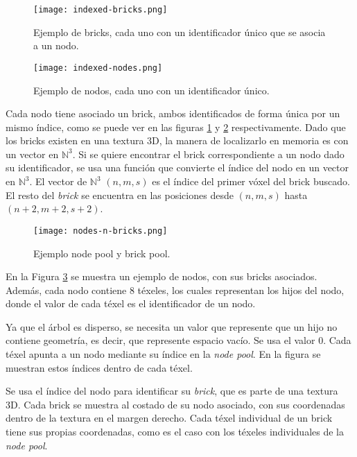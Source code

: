 \begin{figure}[h!]
    \centering
    \texttt{[image: indexed-bricks.png]}
    \caption{Ejemplo de bricks, cada uno con un identificador único que se asocia a un nodo.}
    \label{fig:indexed_bricks}
\end{figure}

\begin{figure}[h!]
    \centering
    \texttt{[image: indexed-nodes.png]}
    \caption{Ejemplo de nodos, cada uno con un identificador único.}
    \label{fig:indexed_nodes}
\end{figure}

Cada nodo tiene asociado un brick, ambos identificados de forma única por un mismo índice, como se puede ver en las figuras \ref{fig:indexed_bricks} y \ref{fig:indexed_nodes} respectivamente.
Dado que los bricks existen en una textura 3D, la manera de localizarlo en memoria es con un vector en $\mathbb{N}^3$.
Si se quiere encontrar el brick correspondiente a un nodo dado su identificador, se usa una función que convierte el índice del nodo en un vector en $\mathbb{N}^3$.
El vector de $\mathbb{N}^3$ $(n, m, s)$ es el índice del primer vóxel del brick buscado.
El resto del \textit{brick} se encuentra en las posiciones desde $(n, m, s)$ hasta $(n + 2, m + 2, s + 2)$.

\begin{figure}[h!]
    \centering
    \texttt{[image: nodes-n-bricks.png]}
    \caption{Ejemplo node pool y brick pool.}
    \label{fig:nodes_n_bricks}
\end{figure}

En la Figura \ref{fig:nodes_n_bricks} se muestra un ejemplo de nodos, con sus bricks asociados.
Además, cada nodo contiene $8$ téxeles, los cuales representan los hijos del nodo, donde el valor de cada téxel es el identificador de un nodo.

Ya que el árbol es disperso, se necesita un valor que represente que un hijo no contiene geometría, es decir, que represente espacio vacío.
Se usa el valor 0.
Cada téxel apunta a un nodo mediante su índice en la \textit{node pool}.
En la figura se muestran estos índices dentro de cada téxel.

Se usa el índice del nodo para identificar su \textit{brick}, que es parte de una textura 3D.
Cada brick se muestra al costado de su nodo asociado, con sus coordenadas dentro de la textura en el margen derecho.
Cada téxel individual de un brick tiene sus propias coordenadas, como es el caso con los téxeles individuales de la \textit{node pool}.

